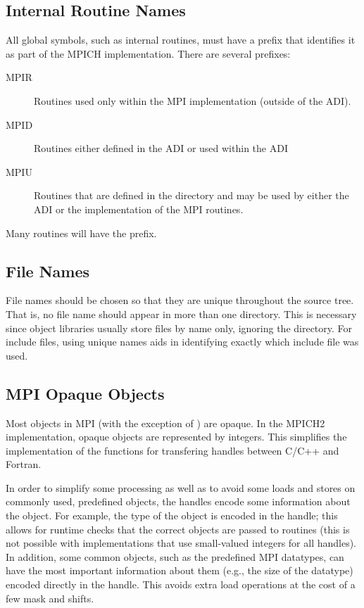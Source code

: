 \documentclass{article}
\begin{document}
\subsection{Internal Routine Names}
\label{sec:routine-names}
All global symbols, such as internal routines, must have a prefix that
identifies it as part of the MPICH implementation.  There are several
prefixes:
\begin{description}
\item[MPIR]Routines used only within the MPI implementation (outside of the
  ADI).
\item[MPID]Routines either defined in the ADI or used within the ADI
\item[MPIU]Routines that are defined in the  directory and
may be used by either the ADI or the implementation of the MPI
routines.
\end{description}
Many routines will have the  prefix.

\subsection{File Names}
\label{sec:mpi-src-filenames}
File names should be chosen so that they are unique throughout the source
tree.  That is, no file name should appear in more than one directory.  This
is necessary since object libraries usually store files by name only, ignoring
the directory.  For include files, using unique names aids in identifying
exactly which include file was used.

\subsection{MPI Opaque Objects}
\label{sec:mpi-opaque}
Most objects in MPI (with the exception of ) are
opaque.  In the MPICH2 implementation, opaque objects are represented
by integers.  This simplifies the implementation of the functions for
transfering handles between C/C++ and Fortran.  

In order to simplify some processing as well as to avoid some loads
and stores on commonly used, predefined objects, the handles encode
some information about the object.  For example, the type of the
object is encoded in the handle; this allows for runtime checks that
the correct objects are passed to routines (this is not possible with
implementations that use small-valued integers for all handles).  In
addition, some common objects, such as the predefined MPI datatypes,
can have the most important information about them (e.g., the size of
the datatype) encoded directly in the handle.  This avoids extra load
operations at the cost of a few mask and shifts. 
\end{document}
